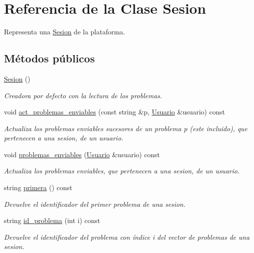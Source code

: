 \hypertarget{class_sesion}{}\section{Referencia de la Clase Sesion}
\label{class_sesion}


Representa una \mbox{\hyperlink{class_sesion}{Sesion}} de la plataforma.  


\subsection*{Métodos públicos}
\begin{DoxyCompactItemize}
\item 
\mbox{\hyperlink{class_sesion_adf5a84efa8e2629b30ad89df74cfc0a2}{Sesion}} ()
\begin{DoxyCompactList}\small\item\em Creadora por defecto con la lectura de los problemas. \end{DoxyCompactList}\item 
void \mbox{\hyperlink{class_sesion_a0fc0dfafa8e3bd98e7d18dff68eb82f2}{act\+\_\+problemas\+\_\+enviables}} (const string \&p, \mbox{\hyperlink{class_usuario}{Usuario}} \&usuario) const
\begin{DoxyCompactList}\small\item\em Actualiza los problemas enviables sucesores de un problema p (este incluido), que pertenecen a una sesion, de un usuario. \end{DoxyCompactList}\item 
void \mbox{\hyperlink{class_sesion_a277a3775d1e19373e3ca507b819b5cc8}{problemas\+\_\+enviables}} (\mbox{\hyperlink{class_usuario}{Usuario}} \&usuario) const
\begin{DoxyCompactList}\small\item\em Actualiza los problemas enviables, que pertenecen a una sesion, de un usuario. \end{DoxyCompactList}\item 
string \mbox{\hyperlink{class_sesion_ac5cabac266d233381c6c94391fe85769}{primera}} () const
\begin{DoxyCompactList}\small\item\em Devuelve el identificador del primer problema de una sesion. \end{DoxyCompactList}\item 
string \mbox{\hyperlink{class_sesion_ae0bb567c32173fab7938766f4dd0fb1a}{id\+\_\+problema}} (int i) const
\begin{DoxyCompactList}\small\item\em Devuelve el identificador del problema con índice i del vector de problemas de una sesion. \end{DoxyCompactList}\item 

\end{DoxyCompactItemize}
